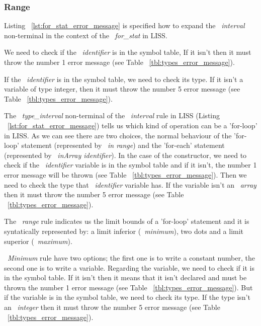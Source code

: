 \documentclass[
  oneside,
  11pt, a4paper,
  footinclude=true,
  headinclude=true,
  cleardoublepage=empty
]{scrbook}
\begin{document}

\subsubsection{Range}

Listing ~\ref{lst:for_stat_error_message} is specified how to expand the ~\textit{interval} non-terminal in the context of the ~\textit{for\_stat} in LISS.

We need to check if the ~\textit{identifier} is in the symbol table, If it isn't then it must throw the number 1 error message (see Table ~\ref{tbl:types_error_message}).

If the ~\textit{identifier} is in the symbol table, we need to check its type. If it isn't a variable of type integer, then it must throw the number 5 error message (see Table ~\ref{tbl:types_error_message}).


The ~\textit{type\_interval} non-terminal of the ~\textit{interval} rule in LISS (Listing ~\ref{lst:for_stat_error_message}) tells us which kind of operation can be a 'for-loop' in LISS.
As we can see there are two choices, the normal behaviour of the 'for-loop' statement (represented by ~\textit{in range}) and the 'for-each' statement (represented by ~\textit{inArray identifier}).
In the case of the constructor, we need to check if the ~\textit{identifier} variable is in the symbol table and if it isn't, the number 1 error message will be thrown (see Table ~\ref{tbl:types_error_message}).
Then we need to check the type that ~\textit{identifier} variable has. If the variable isn't an ~\textit{array} then it must throw the number 5 error message (see Table ~\ref{tbl:types_error_message}).

The ~\textit{range} rule indicates us the limit bounds of a 'for-loop' statement and it is syntatically represented by: a limit inferior (~\textit{minimum}), two dots and a limit superior (~\textit{maximum}).

~\textit{Minimum} rule have two options; the first one is to write a constant number, the second one is to write a variable. Regarding the variable, we need to check if it is in the symbol table. If it isn't then it means that it isn't declared and must be thrown the number 1 error message (see Table ~\ref{tbl:types_error_message}). But if the variable is in the symbol table, we need to check its type. If the type isn't an ~\textit{integer} then it must throw the number 5 error message (see Table ~\ref{tbl:types_error_message}).
\end{document}
